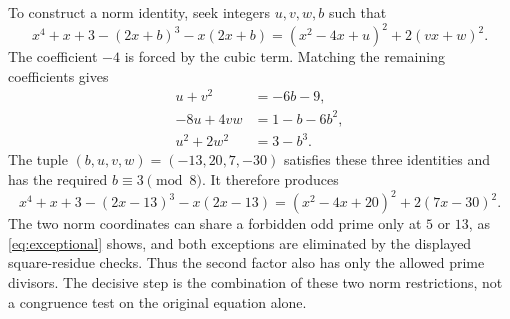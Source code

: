\documentclass[11pt,a4paper]{article}
\begin{document}
To construct a norm identity, seek integers $u,v,w,b$ such that
\[
 x^4+x+3-(2x+b)^3-x(2x+b)
 =(x^2-4x+u)^2+2(vx+w)^2.
\]
The coefficient $-4$ is forced by the cubic term. Matching the remaining
coefficients gives
\[
 \begin{aligned}
 u+v^2&=-6b-9,\\
 -8u+4vw&=1-b-6b^2,\\
 u^2+2w^2&=3-b^3.
 \end{aligned}
\]
The tuple $(b,u,v,w)=(-13,20,7,-30)$ satisfies these three identities
and has the required $b\equiv3\pmod8$. It therefore produces
\[
 x^4+x+3-(2x-13)^3-x(2x-13)
 =(x^2-4x+20)^2+2(7x-30)^2.
\]
The two norm coordinates can share a forbidden odd prime only at $5$ or
$13$, as \eqref{eq:exceptional} shows, and both exceptions are eliminated
by the displayed square-residue checks. Thus the second factor also has
only the allowed prime divisors. The decisive step is the combination
of these two norm restrictions, not a congruence test on the original
equation alone.
\end{document}
